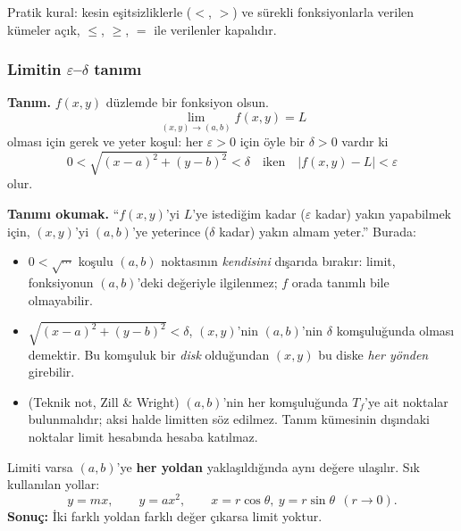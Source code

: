 Pratik kural: kesin eşitsizliklerle ($<$, $>$) ve sürekli fonksiyonlarla verilen kümeler açık, $\le$, $\ge$, $=$ ile
verilenler kapalıdır.

\subsubsection{Limitin \texorpdfstring{$\varepsilon$--$\delta$}{epsilon-delta} tanımı}

\begin{tahta}
\textbf{Tanım.} $f(x,y)$ düzlemde bir fonksiyon olsun.
\[
\lim_{(x,y)\to(a,b)} f(x,y)=L
\]
olması için gerek ve yeter koşul: her $\varepsilon>0$ için öyle bir $\delta>0$ vardır ki
\[
0<\sqrt{(x-a)^2+(y-b)^2}<\delta \quad\text{iken}\quad |f(x,y)-L|<\varepsilon
\]
olur.
\end{tahta}

\textbf{Tanımı okumak.} ``$f(x,y)$'yi $L$'ye istediğim kadar ($\varepsilon$ kadar) yakın yapabilmek için, $(x,y)$'yi
$(a,b)$'ye yeterince ($\delta$ kadar) yakın almam yeter.'' Burada:
\begin{itemize}
  \item $0<\sqrt{\cdots}$ koşulu $(a,b)$ noktasının \emph{kendisini} dışarıda bırakır: limit, fonksiyonun $(a,b)$'deki
        değeriyle ilgilenmez; $f$ orada tanımlı bile olmayabilir.
  \item $\sqrt{(x-a)^2+(y-b)^2}<\delta$, $(x,y)$'nin $(a,b)$'nin $\delta$ komşuluğunda olması demektir. Bu komşuluk bir
        \emph{disk} olduğundan $(x,y)$ bu diske \emph{her yönden} girebilir.
  \item (Teknik not, Zill \& Wright) $(a,b)$'nin her komşuluğunda $T_f$'ye ait noktalar bulunmalıdır; aksi halde limitten
        söz edilmez. Tanım kümesinin dışındaki noktalar limit hesabında hesaba katılmaz.
\end{itemize}

\begin{tahta}
Limiti varsa $(a,b)$'ye \textbf{her yoldan} yaklaşıldığında aynı değere ulaşılır. Sık kullanılan yollar:
\[
y=mx, \qquad y=ax^2, \qquad x=r\cos\theta,\ y=r\sin\theta\ \ (r\to 0).
\]
\textbf{Sonuç:} İki farklı yoldan farklı değer çıkarsa limit yoktur.
\end{tahta}

